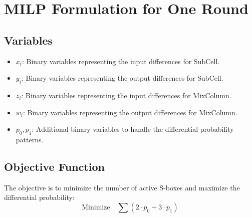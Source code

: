 \documentclass[10pt, a4paper]{article}
\begin{document}
\section*{MILP Formulation for One Round}

\subsection*{Variables}
\begin{itemize}
    \item $x_i$: Binary variables representing the input differences for SubCell.
    \item $y_i$: Binary variables representing the output differences for SubCell.
    \item $z_i$: Binary variables representing the input differences for MixColumn.
    \item $w_i$: Binary variables representing the output differences for MixColumn.
    \item $p_0, p_1$: Additional binary variables to handle the differential probability patterns.
\end{itemize}

\subsection*{Objective Function}
The objective is to minimize the number of active S-boxes and maximize the differential probability:
\begin{equation}
    \text{Minimize} \quad \sum (2 \cdot p_0 + 3 \cdot p_1)
\end{equation}
\end{document}
